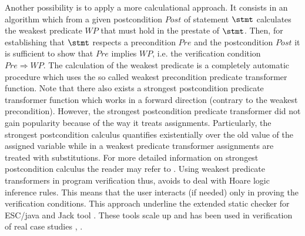 Another possibility is to apply a  more calculational approach. It consists in an algorithm which 
from a given postcondition $Post$   of statement $\stmt$ calculates the weakest predicate $WP$ 
that must hold in the  prestate of $\stmt$. Then, for establishing that
  $\stmt$ respects a precondition
  $Pre$ and the postcondition   $Post$ it is sufficient to show that $Pre$ implies $WP$, i.e. the verification
condition $Pre \Rightarrow WP$. 
The calculation of the weakest predicate is a completely automatic procedure which uses the so called weakest precondition predicate transformer function. 
 Note that there also exists a strongest postcondition predicate transformer function which works in a forward direction 
 (contrary to the weakest precondition). However, the strongest postcondition predicate transformer
 did not gain popularity because of  the way it treats assignments. Particularly, the strongest postcondition calculus
 quantifies  existentially over the old value
 of the assigned variable while in a weakest predicate transformer assignments are treated with  substitutions.
For more detailed information on strongest postcondition calculus the reader may refer to  \cite{WPCDS}.
Using weakest predicate transformers in program verification thus, avoids to deal with Hoare logic inference rules. 
 This means that the user
 interacts (if needed) only in proving the verification conditions. 
This approach underline the extended static checker for ESC/java \cite{escjava} and Jack tool \cite{BRL-JACK}. 
These tools scale up and has been used in verification of real case studies \cite{HuismanJB01}, \cite{BBCGHLPR06:FMCO}.

